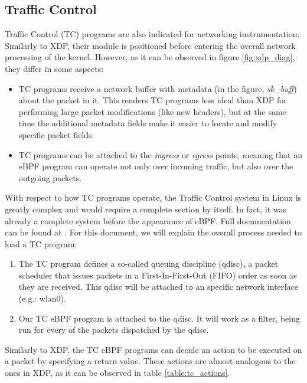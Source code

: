\documentclass[12pt]{report} %
\begin{document}
\subsection{Traffic Control} \label{subsection:tc}
Traffic Control (TC) programs are also indicated for networking instrumentation. Similarly to XDP, their module is positioned before entering the overall network processing of the kernel. However, as it can be observed in figure \ref{fig:xdp_diag}, they differ in some aspects:
\begin{itemize}
\item TC programs receive a network buffer with metadata (in the figure, \textit{sk\_buff}) about the packet in it. This renders TC programs less ideal than XDP for performing large packet modifications (like new headers), but at the same time the additional metadata fields make it easier to locate and modify specific packet fields\cite{tc_differences}.
\item TC programs can be attached to the \textit{ingress} or \textit{egress} points, meaning that an eBPF program can operate not only over incoming traffic, but also over the outgoing packets.
\end{itemize}

With respect to how TC programs operate, the Traffic Control system in Linux is greatly complex and would require a complete section by itself. In fact, it was already a complete system before the appearance of eBPF. Full documentation can be found at \cite{tc_docs_complete}. For this document, we will explain the overall process needed to load a TC program\cite{tc_direct_action}:
\begin{enumerate}
\item The TC program defines a so-called queuing discipline (qdisc), a packet scheduler that issues packets in a First-In-First-Out (FIFO) order as soon as they are received. This qdisc will be attached to an specific network interface (e.g.: wlan0).
\item Our TC eBPF program is attached to the qdisc. It will work as a filter, being run for every of the packets dispatched by the qdisc.
\end{enumerate}

Similarly to XDP, the TC eBPF programs can decide an action to be executed on a packet by specifying a return value. These actions are almost analogous to the ones in XDP, as it can be observed in table \ref{table:tc_actions}.
\end{document}
